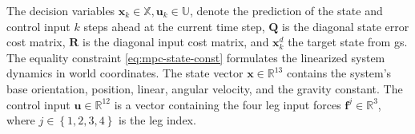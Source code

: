 The decision variables $\mathbf{x}_{k} \in \mathbb{X},\mathbf{u}_{k} \in \mathbb{U}$, denote the prediction of the state and control input $k$ steps ahead at the current time step, $\mathbf{Q}$ is the diagonal state error cost matrix, $\mathbf{R}$ is the diagonal input cost matrix, and $\mathbf{x}^d_{k}$ the target state from \gls{gs}.
The equality constraint \eqref{eq:mpc-state-const} formulates the linearized system dynamics in world coordinates.
The state vector $\mathbf{x} \in \mathbb{R}^{13}$ contains the system's base orientation, position, linear, angular velocity, and the gravity constant. 
The control input $\mathbf{u} \in \mathbb{R}^{12}$ is a vector containing the four leg input forces $\mathbf{f}^j \in \mathbb{R}^3$, where $j\in \left\{1,2,3,4\right\}$ is the leg index.
